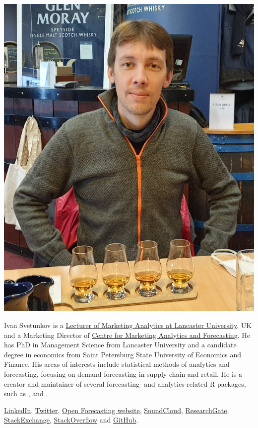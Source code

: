 \documentclass[
]{book}
\theoremstyle{definition}
\theoremstyle{definition}
\theoremstyle{definition}
\theoremstyle{definition}
\theoremstyle{remark}
\begin{document}
\begin{center}\includegraphics[width=0.6\linewidth]{images/IvanSvetunkov-web} \end{center}

Ivan Svetunkov is a \href{https://www.lancaster.ac.uk/lums/people/ivan-svetunkov}{Lecturer of Marketing Analytics at Lancaster University}, UK and a Marketing Director of \href{https://www.lancaster.ac.uk/lums/cmaf/}{Centre for Marketing Analytics and Forecasting}. He has PhD in Management Science from Lancaster University and a candidate degree in economics from Saint Petersburg State University of Economics and Finance. His areas of interests include statistical methods of analytics and forecasting, focusing on demand forecasting in supply-chain and retail. He is a creator and maintainer of several forecasting- and analytics-related R packages, such as \citet{R-greybox}, \citet{R-smooth} and \citet{R-legion}.

\href{https://www.linkedin.com/in/isvetunkov/}{LinkedIn}, \href{https://twitter.com/iSvetunkov}{Twitter}, \href{https://forecasting.svetunkov.ru/}{Open Forecasting website}, \href{https://soundcloud.com/ivan-svetunkov}{SoundCloud}, \href{https://www.researchgate.net/profile/Ivan_Svetunkov}{ResearchGate}, \href{http://stats.stackexchange.com/users/87585/ivan-svetunkov}{StackExchange}, \href{http://stackoverflow.com/users/5296618/ivan-svetunkov}{StackOverflow} and \href{https://github.com/config-i1}{GitHub}.

  
\end{document}
